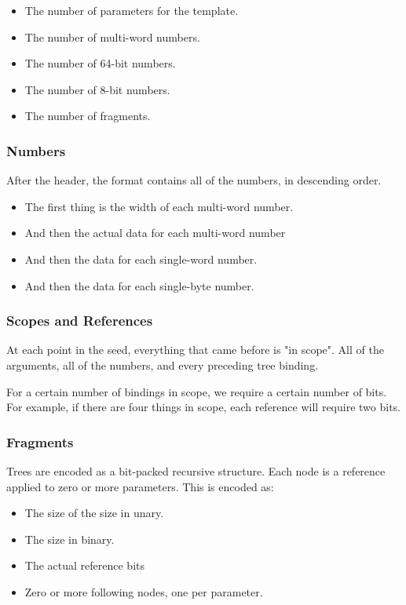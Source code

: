 \begin{itemize}
\item The number of parameters for the template.
\item The number of multi-word numbers.
\item The number of 64-bit numbers.
\item The number of 8-bit numbers.
\item The number of fragments.
\end{itemize}

\subsubsection{Numbers}

After the header, the format contains all of the numbers, in descending order.

\begin{itemize}
\item The first thing is the width of each multi-word number.
\item And then the actual data for each multi-word number
\item And then the data for each single-word number.
\item And then the data for each single-byte number.
\end{itemize}

\subsubsection{Scopes and References}

At each point in the seed, everything that came before is "in scope".
All of the arguments, all of the numbers, and every preceding tree
binding.

For a certain number of bindings in scope, we require a certain number of bits.
For example, if there are four things in scope, each reference will require two
bits.

\subsubsection{Fragments}

Trees are encoded as a bit-packed recursive structure.  Each node is a
reference applied to zero or more parameters.  This is encoded as:

\begin{itemize}
\item The size of the size in unary.
\item The size in binary.
\item The actual reference bits
\item Zero or more following nodes, one per parameter.
\end{itemize}

